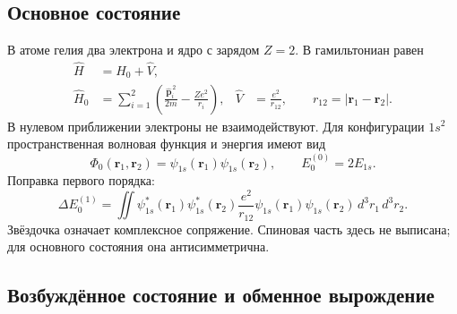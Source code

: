 \documentclass[../final.tex]{subfiles}
\begin{document}
\subsection{Основное состояние}

В атоме гелия два электрона и ядро с зарядом \(Z=2\).
В  гамильтониан равен
\begin{align*}
    \hat H&=\hat H_0+\hat V,\\
    \hat H_0&=\sum_{i=1}^{2}
    \left(\frac{\hat{\mathbf p}_i^{\,2}}{2m}-\frac{Ze^2}{r_i}\right),
    &\hat V&=\frac{e^2}{r_{12}},
    \qquad r_{12}=|\mathbf r_1-\mathbf r_2|.
\end{align*}
В нулевом приближении электроны не взаимодействуют. Для конфигурации
\(1s^2\) пространственная волновая функция и энергия имеют вид
\begin{equation*}
    \Phi_0(\mathbf r_1,\mathbf r_2)
    =\psi_{1s}(\mathbf r_1)\psi_{1s}(\mathbf r_2),
    \qquad E_0^{(0)}=2E_{1s}.
\end{equation*}
Поправка первого порядка:
\begin{equation*}
    \Delta E_0^{(1)}
    =\iint \psi_{1s}^{*}(\mathbf r_1)\psi_{1s}^{*}(\mathbf r_2)
    \frac{e^2}{r_{12}}
    \psi_{1s}(\mathbf r_1)\psi_{1s}(\mathbf r_2)
    \,d^3r_1\,d^3r_2.
\end{equation*}
Звёздочка означает комплексное сопряжение. Спиновая часть здесь
не выписана; для основного состояния она антисимметрична.

\subsection{Возбуждённое состояние и обменное вырождение}
\end{document}
